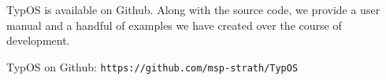 \documentclass{easychair}
\newcommand{\TypOS}{TypOS\xspace}
\begin{document}
\TypOS is available on Github\cite{typos}. Along with the source code, we provide a user manual and a handful of examples we have created over the course of development.


\begin{thebibliography}{1}
 \TypOS on Github: \texttt{https://github.com/msp-strath/TypOS}
\end{thebibliography}
\end{document}
